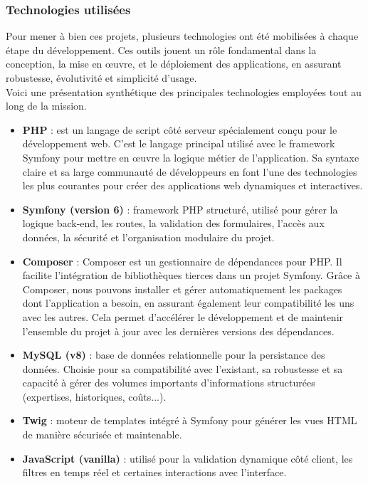 \documentclass[11pt,a4paper]{article}
\begin{document}
\subsubsection{Technologies utilisées}
Pour mener à bien ces projets, plusieurs technologies ont été mobilisées à chaque étape du développement. Ces outils jouent un rôle fondamental dans la conception, la mise en œuvre, et le déploiement des applications, en assurant robustesse, évolutivité et simplicité d’usage. \\
Voici une présentation synthétique des principales technologies employées tout au long de la mission.
\begin{itemize}

\item \textbf{PHP} : 
est un langage de script côté serveur spécialement conçu pour le développement web. C'est le langage principal utilisé avec le framework Symfony pour mettre en œuvre la logique métier de l'application. Sa syntaxe claire et sa large communauté de développeurs en font l'une des technologies les plus courantes pour créer des applications web dynamiques et interactives.

\item \textbf{Symfony (version 6)} : framework PHP structuré, utilisé pour gérer la logique back-end, les routes, la validation des formulaires, l'accès aux données, la sécurité et l'organisation modulaire du projet.

\item \textbf{Composer } :
Composer est un gestionnaire de dépendances pour PHP. Il facilite l'intégration de bibliothèques tierces dans un projet Symfony. Grâce à Composer, nous pouvons installer et gérer automatiquement les packages dont l'application a besoin, en assurant également leur compatibilité les uns avec les autres. Cela permet d'accélérer le développement et de maintenir l'ensemble du projet à jour avec les dernières versions des dépendances.

\item \textbf{MySQL (v8)} : base de données relationnelle pour la persistance des données. Choisie pour sa compatibilité avec l’existant, sa robustesse et sa capacité à gérer des volumes importants d’informations structurées (expertises, historiques, coûts...).

\item \textbf{Twig} : moteur de templates intégré à Symfony pour générer les vues HTML de manière sécurisée et maintenable.

\item \textbf{JavaScript (vanilla)} : utilisé pour la validation dynamique côté client, les filtres en temps réel et certaines interactions avec l’interface.


\end{itemize}
\end{document}
